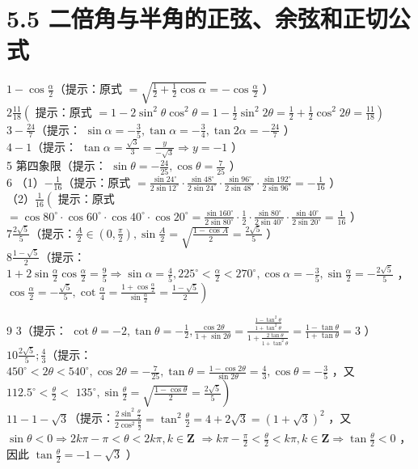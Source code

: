 \documentclass[10pt]{article}
\begin{document}
\section*{5.5 二倍角与半角的正弦、余弦和正切公式}
\(1-\cos \frac{\alpha}{2}\)（提示：原式 \(=\sqrt{\frac{1}{2}+\frac{1}{2} \cos \alpha}=-\cos \frac{\alpha}{2}\) ）\\
\(2 \frac{11}{18}\left(\right.\) 提示：原式 \(\left.=1-2 \sin ^{2} \theta \cos ^{2} \theta=1-\frac{1}{2} \sin ^{2} 2 \theta=\frac{1}{2}+\frac{1}{2} \cos ^{2} 2 \theta=\frac{11}{18}\right)\)\\
\(3-\frac{24}{7}\)（提示： \(\sin \alpha=-\frac{3}{5}, \tan \alpha=-\frac{3}{4}, \tan 2 \alpha=-\frac{24}{7}\) ）\\
\(4-1\)（提示： \(\tan \alpha=\frac{\sqrt{3}}{3}=\frac{y}{-\sqrt{3}} \Rightarrow y=-1\) ）\\
5 第四象限（提示： \(\sin \theta=-\frac{24}{25}, \cos \theta=\frac{7}{25}\) ）\\
6 （1）\(-\frac{1}{16}\)（提示：原式 \(=\frac{\sin 24^{\circ}}{2 \sin 12^{\circ}} \cdot \frac{\sin 48^{\circ}}{2 \sin 24^{\circ}} \cdot \frac{\sin 96^{\circ}}{2 \sin 48^{\circ}} \cdot \frac{\sin 192^{\circ}}{2 \sin 96^{\circ}}=-\frac{1}{16}\) ）\\
（2）\(\frac{1}{16}\left(\right.\) 提示：原式 \(=\cos 80^{\circ} \cdot \cos 60^{\circ} \cdot \cos 40^{\circ} \cdot \cos 20^{\circ}=\frac{\sin 160^{\circ}}{2 \sin 80^{\circ}} \cdot \frac{1}{2} \cdot \frac{\sin 80^{\circ}}{2 \sin 40^{\circ}} \cdot \frac{\sin 40^{\circ}}{2 \sin 20^{\circ}}=\frac{1}{16}\) ）\\
\(7 \frac{2 \sqrt{5}}{5}\)（提示：\(\frac{A}{2} \in\left(0, \frac{\pi}{2}\right), \sin \frac{A}{2}=\sqrt{\frac{1-\cos A}{2}}=\frac{2 \sqrt{5}}{5}\) ）\\
\(8 \frac{1-\sqrt{5}}{2}\)（提示： \(1+2 \sin \frac{\alpha}{2} \cos \frac{\alpha}{2}=\frac{9}{5} \Rightarrow \sin \alpha=\frac{4}{5}, 225^{\circ}<\frac{\alpha}{2}<270^{\circ}, \cos \alpha=-\frac{3}{5}, \sin \frac{\alpha}{2}=-\frac{2 \sqrt{5}}{5}\) ， \(\left.\cos \frac{\alpha}{2}=-\frac{\sqrt{5}}{5}, \cot \frac{\alpha}{4}=\frac{1+\cos \frac{\alpha}{2}}{\sin \frac{\alpha}{2}}=\frac{1-\sqrt{5}}{2}\right)\)

9 3（提示： \(\cot \theta=-2, \tan \theta=-\frac{1}{2}, \frac{\cos 2 \theta}{1+\sin 2 \theta}=\frac{\frac{1-\tan ^{2} \theta}{1+\tan ^{2} \theta}}{1+\frac{2 \tan \theta}{1+\tan ^{2} \theta}}=\frac{1-\tan \theta}{1+\tan \theta}=3\) ）\\
\(10 \frac{2 \sqrt{5}}{5} ; \frac{4}{3}\)（提示： \(450^{\circ}<2 \theta<540^{\circ}, \cos 2 \theta=-\frac{7}{25}, \tan \theta=\frac{1-\cos 2 \theta}{\sin 2 \theta}=\frac{4}{3}, \cos \theta=-\frac{3}{5}\) ，又 \(112.5^{\circ}<\frac{\theta}{2}<\) \(\left.135^{\circ}, \sin \frac{\theta}{2}=\sqrt{\frac{1-\cos \theta}{2}}=\frac{2 \sqrt{5}}{5}\right)\)\\
\(11-1-\sqrt{3}\)（提示：\(\frac{2 \sin ^{2} \frac{\theta}{2}}{2 \cos ^{2} \frac{\theta}{2}}=\tan ^{2} \frac{\theta}{2}=4+2 \sqrt{3}=(1+\sqrt{3})^{2}\) ，又 \(\sin \theta<0 \Rightarrow 2 k \pi-\pi<\theta<2 k \pi, k \in \mathbf{Z}\) \(\Rightarrow k \pi-\frac{\pi}{2}<\frac{\theta}{2}<k \pi, k \in \mathbf{Z} \Rightarrow \tan \frac{\theta}{2}<0\) ，因此 \(\tan \frac{\theta}{2}=-1-\sqrt{3}\) ）
\end{document}
